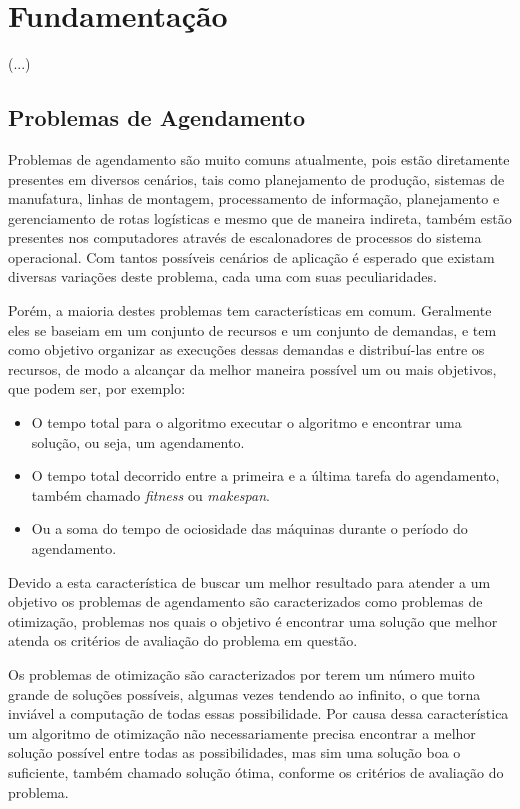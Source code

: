 \chapter{Fundamentação}
(...)

\section{Problemas de Agendamento}
Problemas de agendamento são muito comuns atualmente, pois estão diretamente presentes em diversos cenários, tais como planejamento de produção, sistemas de manufatura, linhas de montagem, processamento de informação, planejamento e gerenciamento de rotas logísticas e mesmo que de maneira indireta, também estão presentes nos computadores através de escalonadores de processos do sistema operacional.
%
Com tantos possíveis cenários de aplicação é esperado que existam diversas variações deste problema, cada uma com suas peculiaridades.


\indent Porém, a maioria destes problemas tem características em comum. Geralmente eles se baseiam em um conjunto de recursos e um conjunto de demandas, e tem como objetivo organizar as execuções dessas demandas e distribuí-las entre os recursos, de modo a alcançar da melhor maneira possível um ou mais objetivos, que podem ser, por exemplo: 
\begin{itemize}
    \item O tempo total para o algoritmo executar o algoritmo e encontrar uma solução, ou seja, um agendamento.
    \item O tempo total decorrido entre a primeira e a última tarefa do agendamento, também chamado \textit{fitness} ou \textit{makespan}.
    \item Ou a soma do tempo de ociosidade das máquinas durante o período do agendamento.
\end{itemize}

Devido a esta característica de buscar um melhor resultado para atender a um objetivo os problemas de agendamento são caracterizados como problemas de otimização, problemas nos quais o objetivo é encontrar uma solução que melhor atenda os critérios de avaliação do problema em questão.


\indent Os problemas de otimização são caracterizados por terem um número muito grande de soluções possíveis, algumas vezes tendendo ao infinito, o que torna inviável a computação de todas essas possibilidade. Por causa dessa característica um algoritmo de otimização não necessariamente precisa encontrar a melhor solução possível entre todas as possibilidades, mas sim uma solução boa o suficiente, também chamado solução ótima, conforme os critérios de avaliação do problema.


